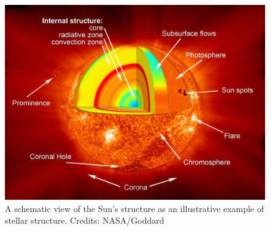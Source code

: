 \begin{figure}[!ht]
\centering
\includegraphics[width=\textwidth, angle=0]{Img/sun_layers.jpg}
\caption{A schematic view of the Sun's structure as an illustrative example of stellar structure. Credits: NASA/Goddard} 
\label{fig:sun}
\end{figure}



